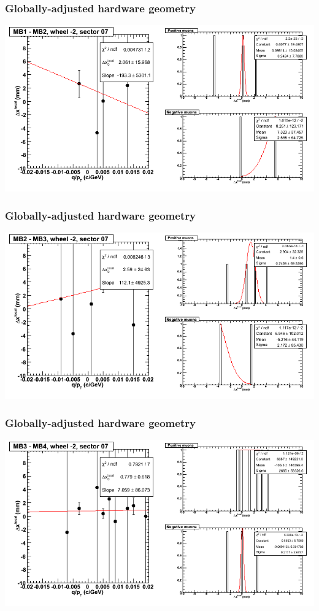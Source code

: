 \documentclass[compress]{beamer}
\begin{document}
\begin{frame}
\frametitle{Globally-adjusted hardware geometry}
\includegraphics[width=\linewidth]{NOV4_segdiffs_HW/dt13_resid_A_07_12.png}
\end{frame}

\begin{frame}
\frametitle{Globally-adjusted hardware geometry}
\includegraphics[width=\linewidth]{NOV4_segdiffs_HW/dt13_resid_A_07_23.png}
\end{frame}

\begin{frame}
\frametitle{Globally-adjusted hardware geometry}
\includegraphics[width=\linewidth]{NOV4_segdiffs_HW/dt13_resid_A_07_34.png}
\end{frame}
\end{document}

